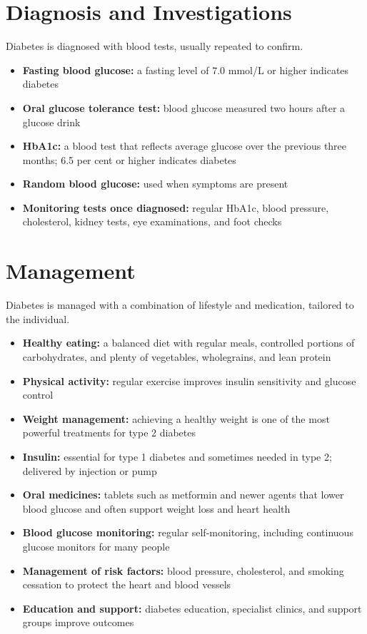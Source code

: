 \section*{Diagnosis and Investigations}
Diabetes is diagnosed with blood tests, usually repeated to confirm.
\begin{itemize}
    \item \textbf{Fasting blood glucose:} a fasting level of 7.0 mmol/L or higher indicates diabetes
    \item \textbf{Oral glucose tolerance test:} blood glucose measured two hours after a glucose drink
    \item \textbf{HbA1c:} a blood test that reflects average glucose over the previous three months; 6.5 per cent or higher indicates diabetes
    \item \textbf{Random blood glucose:} used when symptoms are present
    \item \textbf{Monitoring tests once diagnosed:} regular HbA1c, blood pressure, cholesterol, kidney tests, eye examinations, and foot checks
\end{itemize}

\section*{Management}
Diabetes is managed with a combination of lifestyle and medication, tailored to the individual.
\begin{itemize}
    \item \textbf{Healthy eating:} a balanced diet with regular meals, controlled portions of carbohydrates, and plenty of vegetables, wholegrains, and lean protein
    \item \textbf{Physical activity:} regular exercise improves insulin sensitivity and glucose control
    \item \textbf{Weight management:} achieving a healthy weight is one of the most powerful treatments for type 2 diabetes
    \item \textbf{Insulin:} essential for type 1 diabetes and sometimes needed in type 2; delivered by injection or pump
    \item \textbf{Oral medicines:} tablets such as metformin and newer agents that lower blood glucose and often support weight loss and heart health
    \item \textbf{Blood glucose monitoring:} regular self-monitoring, including continuous glucose monitors for many people
    \item \textbf{Management of risk factors:} blood pressure, cholesterol, and smoking cessation to protect the heart and blood vessels
    \item \textbf{Education and support:} diabetes education, specialist clinics, and support groups improve outcomes
\end{itemize}

